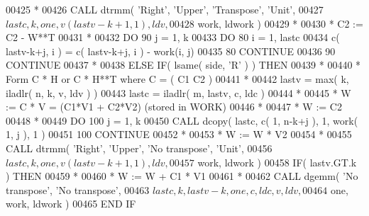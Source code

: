 \begin{DoxyCode}
00425 \textcolor{comment}{*}
00426                \textcolor{keyword}{CALL }dtrmm( \textcolor{stringliteral}{'Right'}, \textcolor{stringliteral}{'Upper'}, \textcolor{stringliteral}{'Transpose'}, \textcolor{stringliteral}{'Unit'},
00427      $              lastc, k, one, v( lastv-k+1, 1 ), ldv,
00428      $              work, ldwork )
00429 \textcolor{comment}{*}
00430 \textcolor{comment}{*              C2 := C2 - W**T}
00431 \textcolor{comment}{*}
00432                \textcolor{keywordflow}{DO} 90 j = 1, k
00433                   \textcolor{keywordflow}{DO} 80 i = 1, lastc
00434                      c( lastv-k+j, i ) = c( lastv-k+j, i ) - work(i, j)
00435    80             \textcolor{keywordflow}{CONTINUE}
00436    90          \textcolor{keywordflow}{CONTINUE}
00437 \textcolor{comment}{*}
00438             \textcolor{keywordflow}{ELSE} \textcolor{keywordflow}{IF}( lsame( side, \textcolor{stringliteral}{'R'} ) ) \textcolor{keywordflow}{THEN}
00439 \textcolor{comment}{*}
00440 \textcolor{comment}{*              Form  C * H  or  C * H**T  where  C = ( C1  C2 )}
00441 \textcolor{comment}{*}
00442                lastv = max( k, iladlr( n, k, v, ldv ) )
00443                lastc = iladlr( m, lastv, c, ldc )
00444 \textcolor{comment}{*}
00445 \textcolor{comment}{*              W := C * V  =  (C1*V1 + C2*V2)  (stored in WORK)}
00446 \textcolor{comment}{*}
00447 \textcolor{comment}{*              W := C2}
00448 \textcolor{comment}{*}
00449                \textcolor{keywordflow}{DO} 100 j = 1, k
00450                   \textcolor{keyword}{CALL }dcopy( lastc, c( 1, n-k+j ), 1, work( 1, j ), 1 )
00451   100          \textcolor{keywordflow}{CONTINUE}
00452 \textcolor{comment}{*}
00453 \textcolor{comment}{*              W := W * V2}
00454 \textcolor{comment}{*}
00455                \textcolor{keyword}{CALL }dtrmm( \textcolor{stringliteral}{'Right'}, \textcolor{stringliteral}{'Upper'}, \textcolor{stringliteral}{'No transpose'}, \textcolor{stringliteral}{'Unit'},
00456      $              lastc, k, one, v( lastv-k+1, 1 ), ldv,
00457      $              work, ldwork )
00458                \textcolor{keywordflow}{IF}( lastv.GT.k ) \textcolor{keywordflow}{THEN}
00459 \textcolor{comment}{*}
00460 \textcolor{comment}{*                 W := W + C1 * V1}
00461 \textcolor{comment}{*}
00462                   \textcolor{keyword}{CALL }dgemm( \textcolor{stringliteral}{'No transpose'}, \textcolor{stringliteral}{'No transpose'},
00463      $                 lastc, k, lastv-k, one, c, ldc, v, ldv,
00464      $                 one, work, ldwork )
00465 \textcolor{keywordflow}{               END IF}

\end{DoxyCode}
